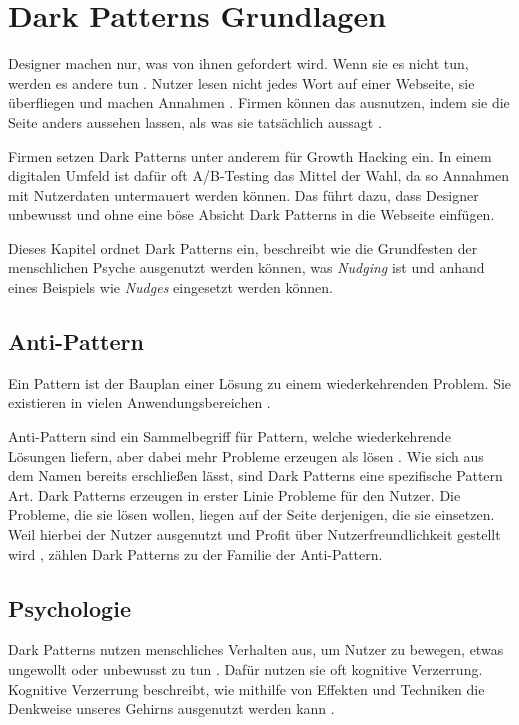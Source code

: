 \documentclass[conference,compsoc,final,a4paper]{IEEEtran}
\begin{document}
\section{Dark Patterns Grundlagen}
Designer machen nur, was von ihnen gefordert wird. Wenn sie es nicht tun, werden es andere tun \autocite{Nerdwriter1_YT_2018}. Nutzer lesen nicht jedes Wort auf einer Webseite, sie überfliegen und machen Annahmen \autocite{Brignull}. Firmen können das ausnutzen, indem sie die Seite anders aussehen lassen, als was sie tatsächlich aussagt \autocite{Brignull}.

Firmen setzen Dark Patterns unter anderem für Growth Hacking ein. In einem digitalen Umfeld ist dafür oft A/B-Testing das Mittel der Wahl, da so Annahmen mit Nutzerdaten untermauert werden können. Das führt dazu, dass Designer unbewusst und ohne eine böse Absicht Dark Patterns in die Webseite einfügen. \autocite{Narayanan2020}

Dieses Kapitel ordnet Dark Patterns ein, beschreibt wie die Grundfesten der menschlichen Psyche ausgenutzt werden können, was \textit{Nudging} ist und anhand eines Beispiels wie \textit{Nudges} eingesetzt werden können.
\subsection{Anti-Pattern}
Ein Pattern ist der Bauplan einer Lösung zu einem wiederkehrenden Problem. Sie existieren in vielen Anwendungsbereichen \autocite[S. 1]{MacDonald2019}.

Anti-Pattern sind ein Sammelbegriff für Pattern, welche wiederkehrende Lösungen liefern, aber dabei mehr Probleme erzeugen als lösen \autocite[S. 193-195]{MacDonald2019}. Wie sich aus dem Namen bereits erschließen lässt, sind Dark Patterns eine spezifische Pattern Art. Dark Patterns erzeugen in erster Linie Probleme für den Nutzer. Die Probleme, die sie lösen wollen, liegen auf der Seite derjenigen, die sie einsetzen. Weil hierbei der Nutzer ausgenutzt und Profit über Nutzerfreundlichkeit gestellt wird \autocite{Chivukula_2019}, zählen Dark Patterns zu der Familie der Anti-Pattern.
\subsection{Psychologie}
\label{chap:Psychologie}
Dark Patterns nutzen menschliches Verhalten aus, um Nutzer zu bewegen, etwas ungewollt oder unbewusst zu tun \autocite{Brignull}. Dafür nutzen sie oft kognitive Verzerrung. Kognitive Verzerrung beschreibt, wie mithilfe von Effekten und Techniken die Denkweise unseres Gehirns ausgenutzt werden kann \autocite{Mathur2019}.
\end{document}
